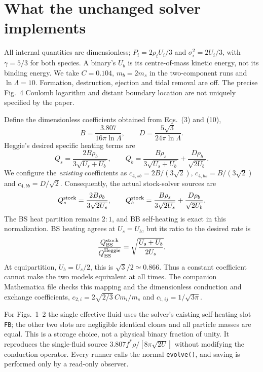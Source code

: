 \documentclass[11pt]{article}
\begin{document}
\section{What the unchanged solver implements}
All internal quantities are dimensionless; $P_i=2\rho_iU_i/3$ and
$\sigma_i^2=2U_i/3$, with $\gamma=5/3$ for both species. A binary's
$U_b$ is its centre-of-mass kinetic energy, not its binding energy.
We take $C=0.104$, $m_b=2m_s$ in the two-component runs and
$\ln\Lambda=10$. Formation, destruction, ejection and tidal removal
are off. The precise Fig.~4 Coulomb logarithm and distant boundary
location are not uniquely specified by the paper.

Define the dimensionless coefficients obtained from Eqs.~(3) and (10),
\begin{equation}
 B=\frac{3.807}{16\pi\ln\Lambda},\qquad
 D=\frac{5\sqrt3}{24\pi\ln\Lambda}.
\end{equation}
Heggie's desired specific heating terms are
\begin{equation}
 Q_s=\frac{2B\rho_b}{3\sqrt{U_s+U_b}},\qquad
 Q_b=\frac{B\rho_s}{3\sqrt{U_s+U_b}}+
       \frac{D\rho_b}{\sqrt{2U_b}}.
\end{equation}
We configure the \emph{existing} coefficients as
$c_{4,sb}=2B/(3\sqrt2)$, $c_{4,bs}=B/(3\sqrt2)$ and
$c_{4,bb}=D/\sqrt2$. Consequently, the actual stock-solver sources are
\begin{equation}
 Q_s^{\rm stock}=\frac{2B\rho_b}{3\sqrt{2U_s}},\qquad
 Q_b^{\rm stock}=\frac{B\rho_s}{3\sqrt{2U_s}}+
       \frac{D\rho_b}{\sqrt{2U_b}}.
\end{equation}
The BS heat partition remains $2:1$, and BB self-heating is exact in
this normalization. BS heating agrees at $U_s=U_b$, but its ratio to
the desired rate is
\begin{equation}
 \frac{Q_{\rm BS}^{\rm stock}}{Q_{\rm BS}^{\rm Heggie}}
 =\sqrt{\frac{U_s+U_b}{2U_s}}.
\end{equation}
At equipartition, $U_b=U_s/2$, this is $\sqrt3/2\simeq0.866$.
Thus a constant coefficient cannot make the two models equivalent at
all times. The companion Mathematica file checks this mapping and the
dimensionless conduction and exchange coefficients,
$c_{2,i}=2\sqrt{2/3}\,C m_i/m_s$ and $c_{1,ij}=1/\sqrt{3\pi}$.

For Figs.~1--2 the single effective fluid uses the solver's existing
self-heating slot \texttt{FB}; the other two slots are negligible
identical clones and all particle masses are equal. This is a storage
choice, not a physical binary fraction of unity. It reproduces the
single-fluid source $3.807f^*\rho/[8\pi\sqrt{2U}]$ without modifying
the conduction operator. Every runner calls the normal \texttt{evolve()},
and saving is performed only by a read-only observer.
\end{document}
